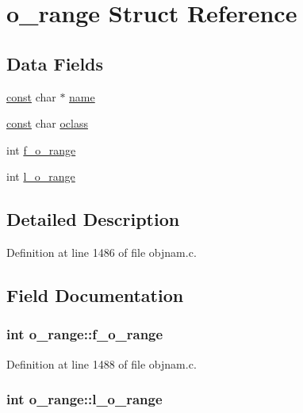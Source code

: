 \hypertarget{structo__range}{\section{o\+\_\+range Struct Reference}
\label{structo__range}
}
\subsection*{Data Fields}
\begin{DoxyCompactItemize}
\item 
\hyperlink{tradstdc_8h_a2c212835823e3c54a8ab6d95c652660e}{const} char $\ast$ \hyperlink{structo__range_ab2341291a89bbb35f012d6124076076c}{name}
\item 
\hyperlink{tradstdc_8h_a2c212835823e3c54a8ab6d95c652660e}{const} char \hyperlink{structo__range_a3d1aa524ba694272ae24bd964f1dde2e}{oclass}
\item 
int \hyperlink{structo__range_a0c1baecd784eb33b31a1363977f17a32}{f\+\_\+o\+\_\+range}
\item 
int \hyperlink{structo__range_a206bfd9d0ed189fa17cf59697eb2db93}{l\+\_\+o\+\_\+range}
\end{DoxyCompactItemize}


\subsection{Detailed Description}


Definition at line 1486 of file objnam.\+c.



\subsection{Field Documentation}
\hypertarget{structo__range_a0c1baecd784eb33b31a1363977f17a32}{
\subsubsection[{f\+\_\+o\+\_\+range}]{\setlength{\rightskip}{0pt plus 5cm}int o\+\_\+range\+::f\+\_\+o\+\_\+range}}\label{structo__range_a0c1baecd784eb33b31a1363977f17a32}


Definition at line 1488 of file objnam.\+c.

\hypertarget{structo__range_a206bfd9d0ed189fa17cf59697eb2db93}{
\subsubsection[{l\+\_\+o\+\_\+range}]{\setlength{\rightskip}{0pt plus 5cm}int o\+\_\+range\+::l\+\_\+o\+\_\+range}}\label{structo__range_a206bfd9d0ed189fa17cf59697eb2db93}


